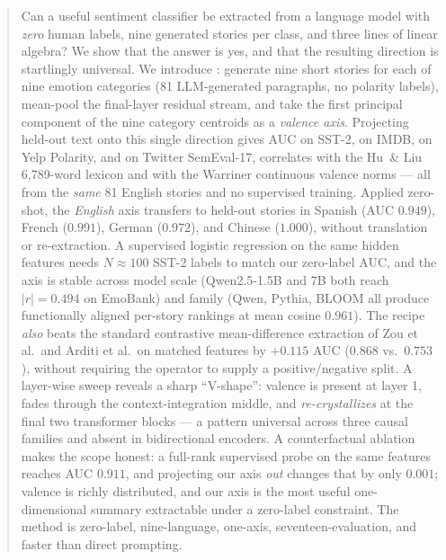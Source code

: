 \begin{abstract}
Can a useful sentiment classifier be extracted from a language model with
\emph{zero} human labels, nine generated stories per class, and three lines
of linear algebra? We show that the answer is yes, and that the resulting
direction is startlingly universal. We introduce \ours: generate nine short
stories for each of nine emotion categories (81 LLM-generated paragraphs,
no polarity labels), mean-pool the final-layer residual stream, and take
the first principal component of the nine category centroids as a
\emph{valence axis}. Projecting held-out text onto this single direction
gives AUC \sstauc{} on SST-2, \imdbauc{} on IMDB, \yelpauc{} on Yelp
Polarity, and \twauc{} on Twitter SemEval-17, correlates \huliur{} with
the Hu~\& Liu 6{,}789-word lexicon and \warrinerr{} with the Warriner
continuous valence norms --- all from the \emph{same} 81 English stories
and no supervised training. Applied zero-shot, the \emph{English} axis
transfers to held-out stories in Spanish (AUC $0.949$), French ($0.991$),
German ($0.972$), and Chinese (\emph{$1.000$}), without translation or
re-extraction. A supervised logistic regression on the same hidden
features needs $N\!\approx\!100$ SST-2 labels to match our zero-label
AUC, and the axis is stable across model scale (Qwen2.5-1.5B and 7B both
reach $|r|\!=\!0.494$ on EmoBank) and family (Qwen, Pythia, BLOOM all
produce functionally aligned per-story rankings at mean cosine $0.961$).
The recipe \emph{also} beats the standard contrastive mean-difference
extraction of Zou et al.\ and Arditi et al.\ on matched features by
$+0.115$ AUC ($0.868$ vs.\ $0.753$), without requiring the operator to
supply a positive/negative split. A layer-wise sweep reveals a sharp
``V-shape'': valence is present at layer 1, fades through the
context-integration middle, and \emph{re-crystallizes} at the final two
transformer blocks --- a pattern universal across three causal families
and absent in bidirectional encoders. A counterfactual ablation makes
the scope honest: a full-rank supervised probe on the same features
reaches AUC $0.911$, and projecting our axis \emph{out} changes that by
only $0.001$; valence is richly distributed, and our axis is the most
useful one-dimensional summary extractable under a zero-label
constraint. The method is zero-label, nine-language, one-axis,
seventeen-evaluation, and \speedup{} faster than direct prompting.
\end{abstract}
